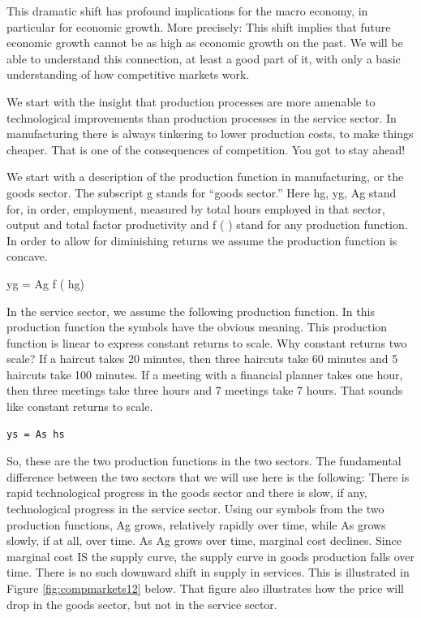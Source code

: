 \documentclass[
]{book}
\begin{document}
This dramatic shift has profound implications for the macro economy, in particular for economic growth. More precisely: This shift implies that future economic growth cannot be as high as economic growth on the past. We will be able to understand this connection, at least a good part of it, with only a basic understanding of how competitive markets work.

We start with the insight that production processes are more amenable to technological improvements than production processes in the service sector. In manufacturing there is always tinkering to lower production costs, to make things cheaper. That is one of the consequences of competition. You got to stay ahead!

We start with a description of the production function in manufacturing, or the goods sector. The subscript g stands for ``goods sector.'' Here hg, yg, Ag stand for, in order, employment, measured by total hours employed in that sector, output and total factor productivity and f ( ) stand for any production function. In order to allow for diminishing returns we assume the production function is concave.

yg = Ag f ( hg)

In the service sector, we assume the following production function. In this production function the symbols have the obvious meaning. This production function is linear to express constant returns to scale. Why constant returns two scale? If a haircut takes 20 minutes, then three haircuts take 60 minutes and 5 haircuts take 100 minutes. If a meeting with a financial planner takes one hour, then three meetings take three hours and 7 meetings take 7 hours. That sounds like constant returns to scale.

\begin{verbatim}
ys = As hs  
\end{verbatim}

So, these are the two production functions in the two sectors. The fundamental difference between the two sectors that we will use here is the following:
There is rapid technological progress in the goods sector and there is slow, if any, technological progress in the service sector. Using our symbols from the two production functions, Ag grows, relatively rapidly over time, while As grows slowly, if at all, over time. As Ag grows over time, marginal cost declines. Since marginal cost IS the supply curve, the supply curve in goods production falls over time. There is no such downward shift in supply in services. This is illustrated in Figure \ref{fig:compmarkets12} below. That figure also illustrates how the price will drop in the goods sector, but not in the service sector.
\end{document}
